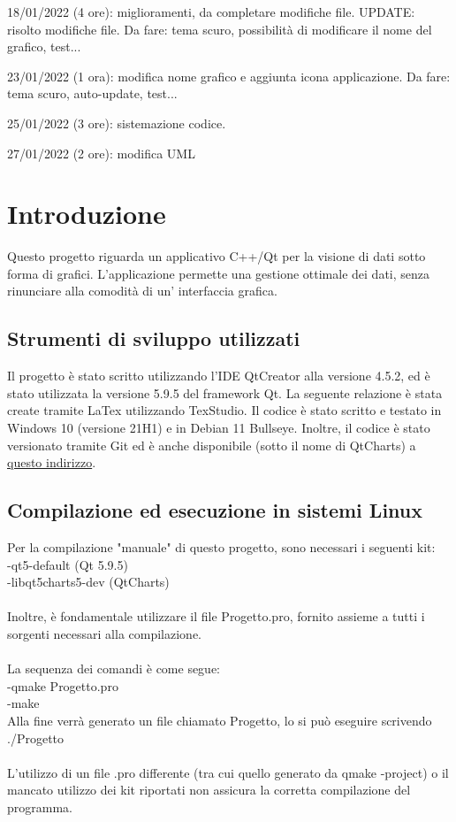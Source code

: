 \documentclass[10pt]{article}
\begin{document}
    18/01/2022 (4 ore): miglioramenti, da completare modifiche file. UPDATE: risolto modifiche file. Da fare: tema scuro, possibilità di modificare il nome del grafico, test...
    
    23/01/2022 (1 ora): modifica nome grafico e aggiunta icona applicazione. Da fare: tema scuro, auto-update, test...
    
    25/01/2022 (3 ore): sistemazione codice.
    
    27/01/2022 (2 ore): modifica UML
    
    \newpage
    \tableofcontents
    \newpage
    \section{Introduzione}
     Questo progetto riguarda un applicativo C++/Qt per la visione di dati sotto forma di grafici. L'applicazione permette una gestione ottimale dei dati, senza rinunciare alla comodità di un' interfaccia grafica.
    \subsection{Strumenti di sviluppo utilizzati}
    Il progetto è stato scritto utilizzando l'IDE QtCreator alla versione 4.5.2, ed è stato utilizzata la versione 5.9.5 del framework Qt. 
    La seguente relazione è stata create tramite LaTex utilizzando TexStudio.
    Il codice è stato scritto e testato in Windows 10 (versione 21H1) e in Debian 11 Bullseye.
    Inoltre, il codice è stato versionato tramite Git ed è anche disponibile (sotto il nome di QtCharts) a \href{https://github.com/nicolabaesso/qtCharts}{questo indirizzo}.
    \subsection{Compilazione ed esecuzione in sistemi Linux}
    Per la compilazione "manuale" di questo progetto, sono necessari i seguenti kit:\\
    -qt5-default (Qt 5.9.5)\\
    -libqt5charts5-dev (QtCharts)
    \\
    \\
    Inoltre, è fondamentale utilizzare il file Progetto.pro, fornito assieme a tutti i sorgenti necessari alla compilazione.\\
    \\
    La sequenza dei comandi è come segue:\\
    -qmake Progetto.pro\\
    -make
    \\
    Alla fine verrà generato un file chiamato Progetto, lo si può eseguire scrivendo ./Progetto\\\\
    L'utilizzo di un file .pro differente (tra cui quello generato da qmake -project) o il mancato utilizzo dei kit riportati non assicura la corretta compilazione del programma.
\end{document}
